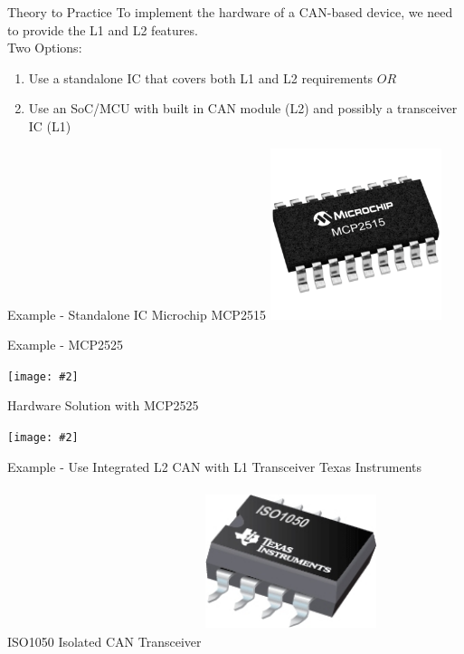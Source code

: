 \documentclass{beamer}
\newcommand {\framedgraphic}[2] {
    \begin{frame}{#1}
        \begin{center}
            \texttt{[image: \#2]}
        \end{center}
    \end{frame}
}
\begin{document}
    \begin{frame}{Theory to Practice}
      To implement the hardware of a CAN-based device, we need to provide the L1 and L2 features.\\ \pause
      Two Options:
      \begin{enumerate}
      \item{Use a standalone IC that covers both L1 and L2 requirements $OR$}\pause
      \item{Use an SoC/MCU with built in CAN module (L2) and possibly a transceiver IC (L1)}
      \end{enumerate}
      \end{frame}

      \begin{frame}{Example - Standalone IC}
        \huge{Microchip MCP2515}
        \centering
            \includegraphics[height=5cm, width=5cm, keepaspectratio=true]{./images/mcp2515_pic}
      \end{frame}

      
     \framedgraphic{Example - MCP2525}{./images/mcp2515_blockdiagram}

     \framedgraphic{Hardware Solution with MCP2525}{./images/mcp2525_soln}

     \begin{frame}{Example - Use Integrated L2 CAN with L1 Transceiver}
        \huge{Texas Instruments ISO1050 Isolated CAN Transceiver}
        \centering
            \includegraphics[height=5cm, width=5cm, keepaspectratio=true]{./images/ISO1050}
     \end{frame}
\end{document}
